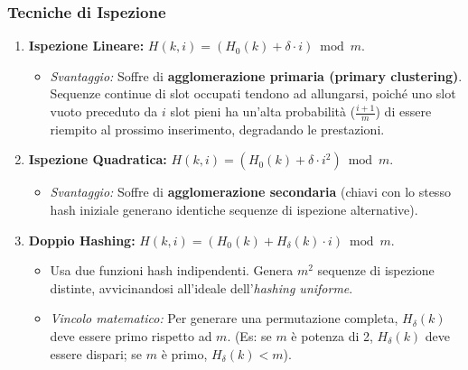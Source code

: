 \documentclass[12pt, a4paper]{article}
\begin{document}
\subsubsection{Tecniche di Ispezione}
\begin{enumerate}
\item \textbf{Ispezione Lineare:} $H(k, i) = (H_0(k) + \delta \cdot i) \bmod m$.
\begin{itemize}
\item \textit{Svantaggio:} Soffre di \textbf{agglomerazione primaria (primary clustering)}. Sequenze continue di slot occupati tendono ad allungarsi, poiché uno slot vuoto preceduto da $i$ slot pieni ha un'alta probabilità ($\frac{i+1}{m}$) di essere riempito al prossimo inserimento, degradando le prestazioni.
\end{itemize}
\item \textbf{Ispezione Quadratica:} $H(k, i) = (H_0(k) + \delta \cdot i^2) \bmod m$.
\begin{itemize}
\item \textit{Svantaggio:} Soffre di \textbf{agglomerazione secondaria} (chiavi con lo stesso hash iniziale generano identiche sequenze di ispezione alternative).
\end{itemize}
\item \textbf{Doppio Hashing:} $H(k, i) = (H_0(k) + H_\delta(k) \cdot i) \bmod m$.
\begin{itemize}
\item Usa due funzioni hash indipendenti. Genera $m^2$ sequenze di ispezione distinte, avvicinandosi all'ideale dell'\textit{hashing uniforme}.
\item \textit{Vincolo matematico:} Per generare una permutazione completa, $H_\delta(k)$ deve essere primo rispetto ad $m$. (Es: se $m$ è potenza di 2, $H_\delta(k)$ deve essere dispari; se $m$ è primo, $H_\delta(k) < m$).
\end{itemize}
\end{enumerate}
\end{document}
